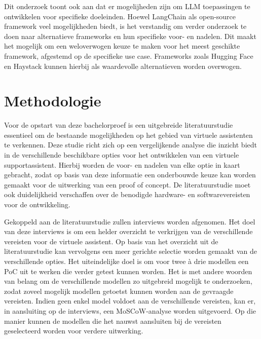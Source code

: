 Dit onderzoek toont ook aan dat er mogelijheden zijn om LLM toepassingen te ontwikkelen voor specifieke doeleinden. Hoewel LangChain als open-source framework veel mogelijkheden biedt, is het verstandig om verder onderzoek te doen naar alternatieve frameworks en hun specifieke voor- en nadelen. Dit maakt het mogelijk om een weloverwogen keuze te maken voor het meest geschikte framework, afgestemd op de specifieke use case. Frameworks zoals Hugging Face en Haystack kunnen hierbij als waardevolle alternatieven worden overwogen.


\section{Methodologie}%
\label{sec:methodologie}

Voor de opstart van deze bachelorproef is een uitgebreide literatuurstudie essentieel om de bestaande mogelijkheden op het gebied van virtuele assistenten te verkennen. Deze studie richt zich op een vergelijkende analyse die inzicht biedt in de verschillende beschikbare opties voor het ontwikkelen van een virtuele supportassistent. Hierbij worden de voor- en nadelen van elke optie in kaart gebracht, zodat op basis van deze informatie een onderbouwde keuze kan worden gemaakt voor de uitwerking van een proof of concept. De literatuurstudie moet ook duidelijkheid verschaffen over de benodigde hardware- en softwarevereisten voor de ontwikkeling.

Gekoppeld aan de literatuurstudie zullen interviews worden afgenomen. Het doel van deze interviews is om een helder overzicht te verkrijgen van de verschillende vereisten voor de virtuele assistent. Op basis van het overzicht uit de literatuurstudie kan vervolgens een meer gerichte selectie worden gemaakt van de verschillende opties. Het uiteindelijke doel is om voor twee à drie modellen een PoC uit te werken die verder getest kunnen worden. Het is met andere woorden van belang om de verschillende modellen zo uitgebreid mogelijk te onderzoeken, zodat zoveel mogelijk modellen getoetst kunnen worden aan de gevraagde vereisten. Indien geen enkel model voldoet aan de verschillende vereisten, kan er, in aansluiting op de interviews, een MoSCoW-analyse worden uitgevoerd. Op die manier kunnen de modellen die het nauwst aansluiten bij de vereisten geselecteerd worden voor verdere uitwerking.

